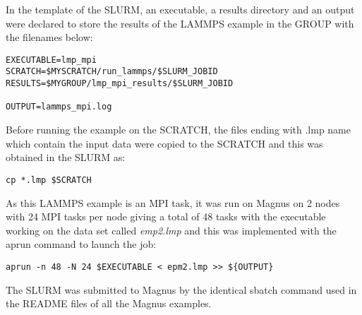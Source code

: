 In the template of the SLURM, an executable, a results directory and an output were declared to store the results of the LAMMPS example in the GROUP 
with the filenames below:

\begin{tcolorbox}
\begin{Verbatim}[fontsize=\scriptsize]
EXECUTABLE=lmp_mpi
SCRATCH=$MYSCRATCH/run_lammps/$SLURM_JOBID
RESULTS=$MYGROUP/lmp_mpi_results/$SLURM_JOBID

OUTPUT=lammps_mpi.log
\end{Verbatim}
\end{tcolorbox}

Before running the example on the SCRATCH, the files ending with .lmp name which contain the input data were copied to the SCRATCH and this was
obtained in the SLURM as:

\begin{tcolorbox}
\begin{Verbatim}[fontsize=\scriptsize]
cp *.lmp $SCRATCH
\end{Verbatim}
\end{tcolorbox}

As this LAMMPS example is an MPI task, it was run on Magnus on 2 nodes with 24 MPI tasks per node giving a total of 48 tasks with the executable working
on the data set called \emph{emp2.lmp} and this was implemented with the aprun command to launch the job:

\begin{tcolorbox}
\begin{Verbatim}[fontsize=\scriptsize]
aprun -n 48 -N 24 $EXECUTABLE < epm2.lmp >> ${OUTPUT}
\end{Verbatim}
\end{tcolorbox}

The SLURM was submitted to Magnus by the identical sbatch command used in the README files of all the Magnus examples.

